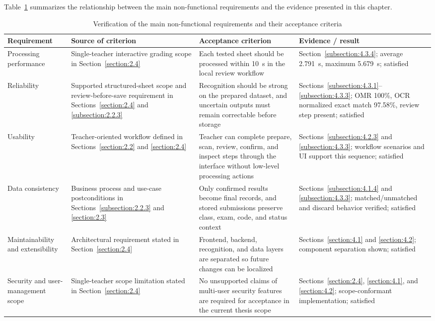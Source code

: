 \documentclass[../Main.tex]{subfiles}
\begin{document}
Table~\ref{table:nonfunctional_verification} summarizes the relationship
between the main non-functional requirements and the evidence presented in this
chapter.

\begin{table}[H]
\centering
\caption{Verification of the main non-functional requirements and their acceptance criteria}
\label{table:nonfunctional_verification}
\scriptsize
\setlength{\tabcolsep}{3pt}
\renewcommand{\arraystretch}{1.25}
\begin{tabular}{|p{}|p{}|p{}|p{}|}
\hline
\textbf{Requirement} & \textbf{Source of criterion} & \textbf{Acceptance criterion} & \textbf{Evidence / result} \\
\hline
Processing performance &
Single-teacher interactive grading scope in Section~\ref{section:2.4} &
Each tested sheet should be processed within 10~s in the local review workflow &
Section~\ref{subsection:4.3.4}; average 2.791~s, maximum 5.679~s; satisfied \\
\hline
Reliability &
Supported structured-sheet scope and review-before-save requirement in Sections~\ref{section:2.4} and \ref{subsection:2.2.3} &
Recognition should be strong on the prepared dataset, and uncertain outputs must remain correctable before storage &
Sections~\ref{subsection:4.3.1}--\ref{subsection:4.3.3}; OMR 100\%, OCR normalized exact match 97.58\%, review step present; satisfied \\
\hline
Usability &
Teacher-oriented workflow defined in Sections~\ref{section:2.2} and \ref{section:2.4} &
Teacher can complete prepare, scan, review, confirm, and inspect steps through the interface without low-level processing actions &
Sections~\ref{subsection:4.2.3} and \ref{subsection:4.3.3}; workflow scenarios and UI support this sequence; satisfied \\
\hline
Data consistency &
Business process and use-case postconditions in Sections~\ref{subsection:2.2.3} and \ref{section:2.3} &
Only confirmed results become final records, and stored submissions preserve class, exam, code, and status context &
Sections~\ref{subsection:4.1.4} and \ref{subsection:4.3.3}; matched/unmatched and discard behavior verified; satisfied \\
\hline
Maintainability and extensibility &
Architectural requirement stated in Section~\ref{section:2.4} &
Frontend, backend, recognition, and data layers are separated so future changes can be localized &
Sections~\ref{section:4.1} and \ref{section:4.2}; component separation shown; satisfied \\
\hline
Security and user-management scope &
Single-teacher scope limitation stated in Section~\ref{section:2.4} &
No unsupported claims of multi-user security features are required for acceptance in the current thesis scope &
Sections~\ref{section:2.4}, \ref{section:4.1}, and \ref{section:4.2}; scope-conformant implementation; satisfied \\
\hline
\end{tabular}
\end{table}
\end{document}
